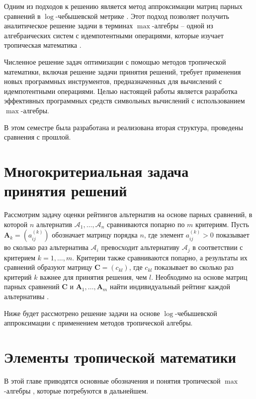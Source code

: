 \documentclass[specialist,
substylefile = spbu.rtx,
               subf,href,colorlinks=true, 12pt]{disser}
\begin{document}
    Одним из подходов к решению является метод аппроксимации матриц парных сравнений в $\log$-чебышевской метрике \cite{Krivulin2019Metody,Krivulin2019Tropical,Krivulin2022Using,Krivulin2020Reshenie}. Этот подход позволяет получить аналитическое решение задачи в терминах $\max$-алгебры -- одной из алгебраических систем с идемпотентными операциями, которые изучает тропическая математика \cite{Maslov1994Idemotent, Butkovic2010Maxlinear, Heidergott2006Max}.
    
    Численное решение задач оптимизации с помощью методов тропической математики, включая решение задачи принятия решений, требует применения новых программных инструментов, предназначенных для вычислений с идемпотентными операциями. Целью настоящей работы является разработка эффективных программных средств символьных вычислений с использованием $\max$-алгебры.

    В этом семестре была разработана и реализована вторая структура, проведены сравнения с прошлой.


    \chapter{Многокритериальная задача принятия решений}

    Рассмотрим задачу оценки рейтингов альтернатив на основе парных сравнений, в которой $n$ альтернатив $\mathcal{A}_{1}, \ldots, \mathcal{A}_{n}$ сравниваются попарно по $m$ критериям. Пусть $\bm{A}_{k} = (a_{ij}^{(k)})$ обозначает матрицу порядка $n$, где элемент $a_{ij}^{(k)}>0$ показывает во сколько раз альтернатива $\mathcal{A}_{i}$ превосходит альтернативу $\mathcal{A}_{j}$ в соответствии с критерием $k=1,\ldots,m$. Критерии также сравниваются попарно, а результаты их сравнений образуют матрицу $\bm{C}=(c_{kl})$, где $c_{kl}$ показывает во сколько раз критерий $k$ важнее для принятия решения, чем $l$. Необходимо на основе матриц парных сравнений $\bm{C}$ и $\bm{A}_{1},\ldots,\bm{A}_{m}$ найти индивидуальный рейтинг каждой альтернативы \cite{Saaty1993Prinyatie}.
    
    Ниже будет рассмотрено решение задачи на основе $\log$-чебышевской аппроксимации с применением методов тропической алгебры.

    \chapter{Элементы тропической математики}

    В этой главе приводятся основные обозначения и понятия тропической $\max$-алгебры \cite{Maslov1994Idemotent, Butkovic2010Maxlinear, Heidergott2006Max}, которые потребуются в дальнейшем.
    
\end{document}
